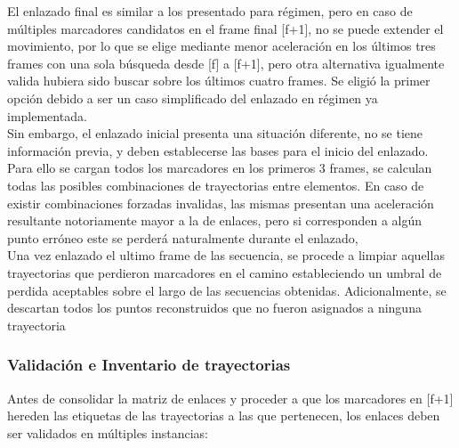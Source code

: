 El enlazado final es similar a los presentado para régimen, pero en caso de múltiples marcadores candidatos en el frame final [f+1], no se puede extender el movimiento, por lo que se elige mediante menor aceleración en los últimos tres frames con una sola búsqueda desde [f] a [f+1], pero otra alternativa igualmente valida hubiera sido buscar sobre los últimos cuatro frames. Se eligió la primer opción debido a  ser un caso simplificado del enlazado en régimen ya implementada. 
\\ 

Sin embargo, el enlazado inicial presenta una situación diferente, no se tiene información previa, y deben establecerse las bases para el inicio del enlazado. Para ello se cargan todos los marcadores en los primeros 3 frames, se calculan todas las posibles combinaciones de trayectorias entre elementos. En caso de existir combinaciones forzadas invalidas, las mismas presentan una aceleración resultante notoriamente mayor a la de enlaces, pero si corresponden a algún punto erróneo este se perderá naturalmente durante el enlazado,
\\ 

Una vez enlazado el ultimo frame de las secuencia, se procede a limpiar aquellas trayectorias que perdieron marcadores en el camino estableciendo un umbral de perdida aceptables sobre el largo de las secuencias obtenidas. Adicionalmente, se descartan todos los puntos reconstruidos que no fueron asignados a ninguna trayectoria 


\subsubsection{Validación e Inventario de trayectorias}

Antes de consolidar la matriz de enlaces y proceder a que los marcadores en [f+1] hereden las etiquetas de las trayectorias a las que pertenecen, los enlaces deben ser validados en múltiples instancias:

